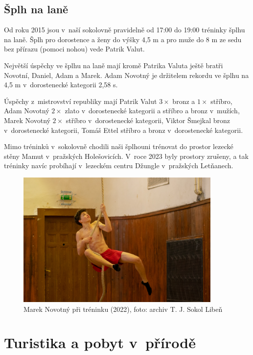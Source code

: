 \documentclass[a5paper, 11pt, twoside]{article}
\begin{document}
\subsection{Šplh na laně}

Od roku 2015 jsou v~naší sokolovně pravidelně od 17:00 do 19:00 tréninky
šplhu na laně. Šplh pro dorostence a ženy do výšky 4,5 m a pro muže do 8
m ze sedu bez přírazu (pomoci nohou) vede Patrik Valut.

Největší úspěchy ve šplhu na laně mají kromě Patrika Valuta ještě bratři
Novotní, Daniel, Adam a Marek. Adam Novotný je držitelem rekordu ve
šplhu na 4,5 m v~dorostenecké kategorii 2,58 s.

Úspěchy z~mistrovství republiky mají Patrik Valut \(3\times\) bronz a \(1\times\) stříbro,
Adam Novotný \(2\times\) zlato v~dorostenecké kategorii a stříbro a bronz
v~mužích, Marek Novotný \(2\times\) stříbro v~dorostenecké kategorii, Viktor
Šmejkal bronz v~dorostenecké kategorii, Tomáš Ettel stříbro a bronz
v~dorostenecké kategorii.

Mimo tréninků v~sokolovně chodili naši šplhouni trénovat do prostor
lezecké stěny Mamut v~pražských Holešovicích. V~roce 2023 byly prostory
zrušeny, a tak tréninky navíc probíhají v~lezeckém centru Džungle
v~pražských Letňanech.

\begin{figure}[h]
  \centering 
  \includegraphics[width=0.9\textwidth]{img/76_splh.jpg}
  \caption*{Marek Novotný při tréninku (2022), foto: archiv T. J. Sokol Libeň}
\end{figure}

\section{Turistika a pobyt v~přírodě}
\end{document}
